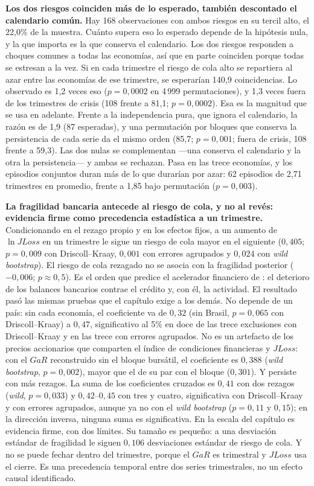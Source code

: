 \textbf{Los dos riesgos coinciden más de lo esperado, también descontado el calendario común.} Hay 168 observaciones con ambos riesgos en su tercil alto, el 22,0\% de la muestra. Cuánto supera eso lo esperado depende de la hipótesis nula, y la que importa es la que conserva el calendario. Los dos riesgos responden a choques comunes a todas las economías, así que en parte coinciden porque todas se estresan a la vez. Si en cada trimestre el riesgo de cola alto se repartiera al azar entre las economías de ese trimestre, se esperarían 140,9 coincidencias. Lo observado es 1,2 veces eso ($p=0{,}0002$ en 4\,999 permutaciones), y 1,3 veces fuera de los trimestres de crisis (108 frente a 81,1; $p=0{,}0002$). Esa es la magnitud que se usa en adelante. Frente a la independencia pura, que ignora el calendario, la razón es de 1,9 (87 esperadas), y una permutación por bloques que conserva la persistencia de cada serie da el mismo orden (85,7; $p=0{,}001$; fuera de crisis, 108 frente a 59,3). Las dos nulas se complementan ---una conserva el calendario y la otra la persistencia--- y ambas se rechazan. Pasa en las trece economías, y los episodios conjuntos duran más de lo que durarían por azar: 62 episodios de 2,71 trimestres en promedio, frente a 1,85 bajo permutación ($p=0{,}003$).

\textbf{La fragilidad bancaria antecede al riesgo de cola, y no al revés: evidencia firme como precedencia estadística a un trimestre.} Condicionando en el rezago propio y en los efectos fijos, a un aumento de $\ln JLoss$ en un trimestre le sigue un riesgo de cola mayor en el siguiente ($0{,}405$; $p=0{,}009$ con Driscoll--Kraay, $0{,}001$ con errores agrupados y $0{,}024$ con \textit{wild bootstrap}). El riesgo de cola rezagado no se asocia con la fragilidad posterior ($-0{,}006$; $p\approx0{,}5$). Es el orden que predice el acelerador financiero de \citet{BernankeGertlerGilchrist1996}: el deterioro de los balances bancarios contrae el crédito y, con él, la actividad. El resultado pasó las mismas pruebas que el capítulo exige a los demás. No depende de un país: sin cada economía, el coeficiente va de $0{,}32$ (sin Brasil, $p=0{,}065$ con Driscoll--Kraay) a $0{,}47$, significativo al 5\% en doce de las trece exclusiones con Driscoll--Kraay y en las trece con errores agrupados. No es un artefacto de los precios accionarios que comparten el índice de condiciones financieras y $JLoss$: con el $GaR$ reconstruido sin el bloque bursátil, el coeficiente es $0{,}388$ (\textit{wild bootstrap}, $p=0{,}002$), mayor que el de su par con el bloque ($0{,}301$). Y persiste con más rezagos. La suma de los coeficientes cruzados es $0{,}41$ con dos rezagos (\textit{wild}, $p=0{,}033$) y $0{,}42$--$0{,}45$ con tres y cuatro, significativa con Driscoll--Kraay y con errores agrupados, aunque ya no con el \textit{wild bootstrap} ($p=0{,}11$ y $0{,}15$); en la dirección inversa, ninguna suma es significativa. En la escala del capítulo es evidencia firme, con dos límites. Su tamaño es pequeño: a una desviación estándar de fragilidad le siguen $0{,}106$ desviaciones estándar de riesgo de cola. Y no se puede fechar dentro del trimestre, porque el $GaR$ es trimestral y $JLoss$ usa el cierre. Es una precedencia temporal entre dos series trimestrales, no un efecto causal identificado.

